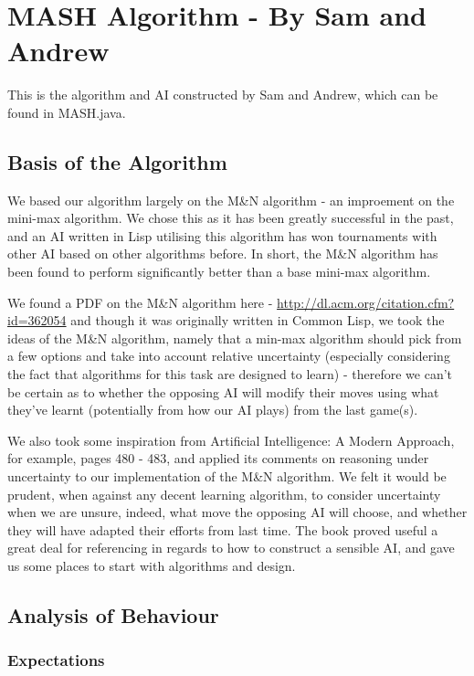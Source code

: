 \documentclass[11pt]{article}
\begin{document}
\section{MASH Algorithm - By Sam and Andrew}
\label{sec-3}

This is the algorithm and AI constructed by Sam and Andrew, which can be found in MASH.java.

\subsection{Basis of the Algorithm}
\label{sec-3-1}

We based our algorithm largely on the M\&N algorithm - an improement on the mini-max algorithm. We chose this as it has been greatly successful in the past, and an AI written in Lisp utilising this algorithm has won tournaments with other AI based on other algorithms before. In short, the M\&N algorithm has been found to perform significantly better than a base mini-max algorithm.

We found a PDF on the M\&N algorithm here - \url{http://dl.acm.org/citation.cfm?id=362054} and though it was originally written in Common Lisp, we took the ideas of the M\&N algorithm, namely that a min-max algorithm should pick from a few options and take into account relative uncertainty (especially considering the fact that algorithms for this task are designed to learn) - therefore we can't be certain as to whether the opposing AI will modify their moves using what they've learnt (potentially from how our AI plays) from the last game(s).

We also took some inspiration from Artificial Intelligence: A Modern Approach, for example, pages 480 - 483, and applied its comments on reasoning under uncertainty to our implementation of the M\&N algorithm. We felt it would be prudent, when against any decent learning algorithm, to consider uncertainty when we are unsure, indeed, what move the opposing AI will choose, and whether they will have adapted their efforts from last time. The book proved useful a great deal for referencing in regards to how to construct a sensible AI, and gave us some places to start with algorithms and design.
\subsection{Analysis of Behaviour}
\label{sec-3-2}

\subsubsection{Expectations}
\label{sec-3-2-1}
\end{document}
